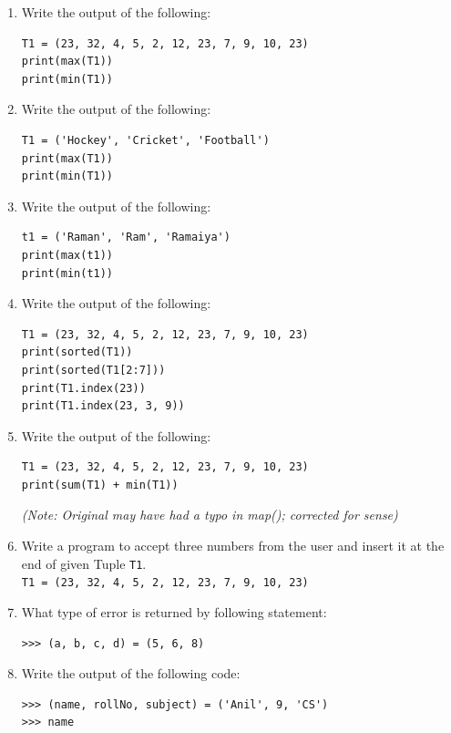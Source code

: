 \documentclass[11pt,a4paper]{article}
\begin{document}
\begin{enumerate}[label=\textbf{Q\arabic*.}]
\item Write the output of the following:
\begin{lstlisting}
T1 = (23, 32, 4, 5, 2, 12, 23, 7, 9, 10, 23)
print(max(T1))
print(min(T1))
\end{lstlisting}

\item Write the output of the following:
\begin{lstlisting}
T1 = ('Hockey', 'Cricket', 'Football')
print(max(T1))
print(min(T1))
\end{lstlisting}

\item Write the output of the following:
\begin{lstlisting}
t1 = ('Raman', 'Ram', 'Ramaiya')
print(max(t1))
print(min(t1))
\end{lstlisting}

\item Write the output of the following:
\begin{lstlisting}
T1 = (23, 32, 4, 5, 2, 12, 23, 7, 9, 10, 23)
print(sorted(T1))
print(sorted(T1[2:7]))
print(T1.index(23))
print(T1.index(23, 3, 9))
\end{lstlisting}

\item Write the output of the following:
\begin{lstlisting}
T1 = (23, 32, 4, 5, 2, 12, 23, 7, 9, 10, 23)
print(sum(T1) + min(T1))
\end{lstlisting}
\textit{(Note: Original may have had a typo in map(); corrected for sense)}

\item Write a program to accept three numbers from the user and insert it at the end of given Tuple \texttt{T1}.\\
\texttt{T1 = (23, 32, 4, 5, 2, 12, 23, 7, 9, 10, 23)}

\item What type of error is returned by following statement:
\begin{lstlisting}
>>> (a, b, c, d) = (5, 6, 8)
\end{lstlisting}

\item Write the output of the following code:
\begin{lstlisting}
>>> (name, rollNo, subject) = ('Anil', 9, 'CS')
>>> name
\end{lstlisting}


\end{enumerate}
\end{document}
